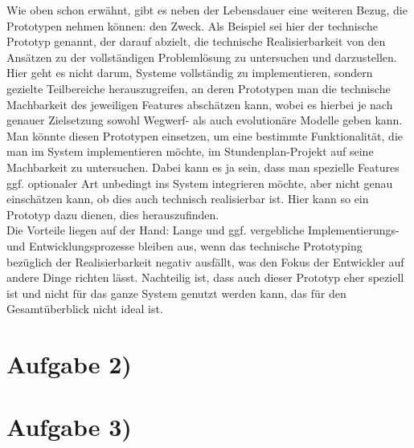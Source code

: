 \documentclass{swp1}
\begin{document}
Wie oben schon erwähnt, gibt es neben der Lebensdauer eine weiteren Bezug, die Prototypen nehmen können: den Zweck. Als Beispiel sei hier der technische Prototyp genannt, der darauf abzielt, die technische Realisierbarkeit von den Ansätzen zu der vollständigen Problemlösung zu untersuchen und darzustellen. Hier geht es nicht darum, Systeme vollständig zu implementieren, sondern gezielte Teilbereiche herauszugreifen, an deren Prototypen man die technische Machbarkeit des jeweiligen Features abschätzen kann, wobei es  hierbei je nach genauer Zielsetzung sowohl Wegwerf- als auch evolutionäre Modelle geben kann. \\
Man könnte diesen Prototypen einsetzen, um eine bestimmte Funktionalität, die man im System implementieren möchte, im Stundenplan-Projekt auf seine Machbarkeit zu untersuchen. Dabei kann es ja sein, dass man spezielle Features ggf. optionaler Art unbedingt ins System integrieren möchte, aber nicht genau einschätzen kann, ob dies auch technisch realisierbar ist. Hier kann so ein Prototyp dazu dienen, dies herauszufinden.\\
Die Vorteile liegen auf der Hand: Lange und ggf. vergebliche Implementierungs- und Entwicklungsprozesse bleiben aus, wenn das technische Prototyping bezüglich der Realisierbarkeit negativ ausfällt, was den Fokus der Entwickler auf andere Dinge richten lässt. Nachteilig ist, dass auch dieser Prototyp eher speziell ist und nicht für das ganze System genutzt werden kann, das für den Gesamtüberblick nicht ideal ist. 
   

\section*{Aufgabe 2)}
\section*{Aufgabe 3)}
\end{document}
